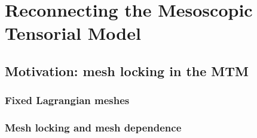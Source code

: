\chapter[Reconnecting MTM]{Reconnecting the Mesoscopic Tensorial Model}
\label{chp4_ReMTM}
\ChapterToc


\cite{burkhart_finite_2013} %

\cite{alauzet_changing-topology_2014} %
\cite{jiao_surface_2013} %

\section{Motivation: mesh locking in the MTM}
\label{sec:ReMTMMotivation}

\cite{pietroni_hex-mesh_2023}%
\cite{blecua_elasticity-based_2023} %


  \subsection{Fixed Lagrangian meshes}
  \label{sec:FixedLagrangianMeshes}
    \cite{lohner_arbitrary_2023} %
    \cite{wicke_dynamic_2010} %
   
    
  \subsection{Mesh locking and mesh dependence}
  \label{sec:MeshLockingDependence}
\cite{engrand_development_2026} %

